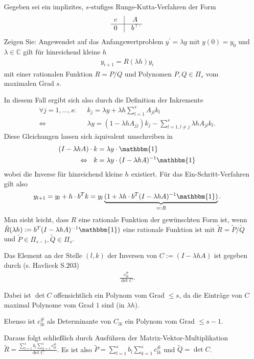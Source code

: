 \begin{exercise}
Gegeben sei ein implizites, $s$-stufiges Runge-Kutta-Verfahren der Form
\renewcommand{\arraystretch}{1.5}
\begin{align}
  \begin{matrix}
  c & \vline & A \\
  \hline
  0 & \vline & b^{\top}
  \end{matrix}.
\end{align}
Zeigen Sie: Angewendet auf das Anfangswertproblem $y^{\prime} = \lambda y$ mit
$y(0) = y_0$ und $\lambda \in \mathbb{C}$ gilt für hinreichend kleine $h$
\begin{align}
  y_{i+1} = R(\lambda h)y_i
\end{align}
mit einer rationalen Funktion $R = P/Q$ und Polynomen $P,Q \in \Pi_s$ vom
maximalen Grad $s$.
\end{exercise}
\begin{solution}
In diesem Fall ergibt sich also durch die Definition der Inkremente
\begin{align*}
    \forall j = 1,\dots,s: \text{~~} & k_{j} = \lambda y + \lambda h\sum_{l=1}^{s}A_{jl}k_{l} \\
    \Leftrightarrow \text{~~} & \lambda y =(1- \lambda hA_{jj})k_{j} -\sum_{l=1, l \neq j}^{s}\lambda hA_{jl}k_{l} .
\end{align*}
Diese Gleichungen lassen sich äquivalent umschreiben in
\begin{align*}
    (I-\lambda hA)\cdot k &= \lambda y \cdot \mathbbm{1} \\
    \Leftrightarrow \text{~~} k &= \lambda y \cdot (I-\lambda hA)^{-1} \mathbbm{1}
\end{align*}
wobei die Inverse für hinreichend kleine $h$ existiert.
Für das Ein-Schritt-Verfahren gilt also
\begin{align}
    y_{l+1} = y_{l} + h\cdot b^{T} k = y_{l}\underbrace{(1 + \lambda h \cdot b^{T}(I-\lambda hA)^{-1} \mathbbm{1})}_{=:R} .
\end{align}
Man sieht leicht, dass $R$ eine rationale Funktion der gewünschten Form ist, wenn $\tilde{R}(\lambda h) := b^{T}(I-\lambda hA)^{-1} \mathbbm{1})$ eine rationale Funktion ist mit $\tilde{R} = \tilde{P}/\tilde{Q}$ und $\tilde{P} \in \Pi_{s-1}, \tilde{Q} \in \Pi_{s}$.

Das Element an der Stelle $(l,k)$ der Inversen von $C := (I-\lambda hA)$ ist gegeben durch (s. Havlicek S.$203$)
\begin{align*}
    \frac{c_{lk}^{\#}}{\det C}.
\end{align*}

Dabei ist $\det C$ offensichtlich ein Polynom vom Grad $\leq s$, da die Einträge von $C$ maximal Polynome vom Grad $1$ sind (in $\lambda h$).

Ebenso ist $c_{lk}^{\#}$ als Determinante von $C_{lk}$ ein Polynom vom Grad $\leq s-1$.

Daraus folgt schließlich durch Ausführen der Matrix-Vektor-Multiplikation $\tilde{R} = \frac{\sum_{l=1}^{s}b_{l}\sum_{k=1}^{s}c_{lk}^{\#}}{\det C}$. Es ist also $\tilde{P} = \sum_{l=1}^{s}b_{l}\sum_{k=1}^{s}c_{lk}^{\#}$ und $\tilde{Q} = \det C$.
\end{solution}
